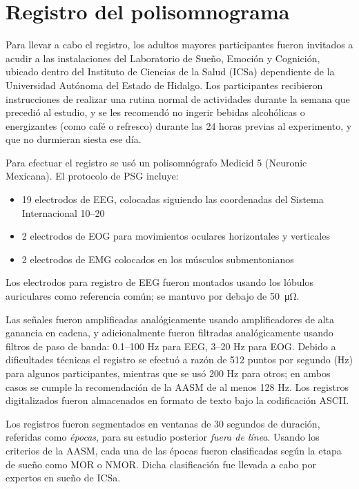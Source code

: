 \section{Registro del polisomnograma}

Para llevar a cabo el registro, los adultos mayores participantes fueron invitados a acudir a las 
instalaciones del Laboratorio de Sueño, Emoción y Cognición, ubicado dentro del Instituto de Ciencias 
de la Salud (ICSa) dependiente de la Universidad Autónoma del Estado de Hidalgo. Los participantes 
recibieron instrucciones de realizar una rutina normal de actividades durante la semana que 
precedió al estudio, y se les recomendó no ingerir bebidas alcohólicas o energizantes (como café 
o refresco) durante las 24 horas previas al experimento, y que no durmieran siesta ese día.

Para efectuar el registro se usó un polisomnógrafo Medicid 5 (Neuronic Mexicana). El protocolo de 
PSG incluye: 
\begin{itemize}
\item 19 electrodos de EEG, colocadas siguiendo las coordenadas del Sistema Internacional 10--20
\item 2 electrodos de EOG para movimientos oculares horizontales y verticales
\item 2 electrodos de EMG colocados en los músculos submentonianos
\end{itemize}
%
Los electrodos para registro de EEG fueron montados usando los lóbulos auriculares como referencia
común; se mantuvo por debajo de \SI{50}{\micro\ohm}.

Las señales fueron amplificadas analógicamente usando amplificadores de alta ganancia en cadena, 
y adicionalmente fueron filtradas analógicamente usando filtros de paso de banda: 0.1--100 Hz 
para EEG, 3--20 Hz para EOG. 
Debido a dificultades técnicas el registro se efectuó a razón de 512 puntos por segundo (Hz) para 
algunos participantes, mientras que se usó 200 Hz para otros; en ambos casos se cumple la 
recomendación de la AASM de al menos 128 Hz.
%
Los registros digitalizados fueron almacenados en formato de texto bajo la codificación 
ASCII.

Los registros fueron segmentados en ventanas de 30 segundos de duración, referidas como 
\textit{épocas}, para su estudio posterior \textit{fuera de línea}. 
Usando los criterios de la AASM, cada una de las épocas fueron clasificadas según la etapa
de sueño como MOR o NMOR. Dicha clasificación fue llevada a cabo por expertos en sueño de ICSa.

